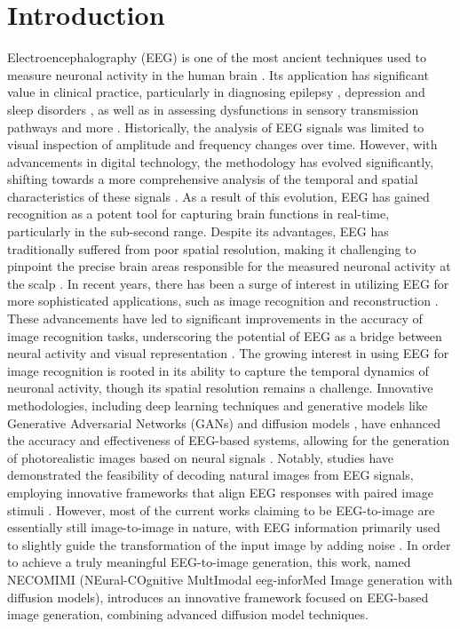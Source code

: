 \documentclass{article}
\begin{document}
\section{Introduction}
Electroencephalography (EEG) is one of the most ancient techniques used to measure neuronal activity in the human brain \cite{mary_1959, millett_2001}. Its application has significant value in clinical practice, particularly in diagnosing epilepsy \cite{reif_strzelczyk_rosenow_2016}, depression \cite{li_chen_cheng_chen_chen_chen_bai_tsai_2023} and sleep disorders \cite{Hussain2022Quantitative}, as well as in assessing dysfunctions in sensory transmission pathways \cite{Thoma2003Lateralization} and more \cite{Perrottelli2021EEG-Based}. Historically, the analysis of EEG signals was limited to visual inspection of amplitude and frequency changes over time. However, with advancements in digital technology, the methodology has evolved significantly, shifting towards a more comprehensive analysis of the temporal and spatial characteristics of these signals \cite{frey_2016}. As a result of this evolution, EEG has gained recognition as a potent tool for capturing brain functions in real-time, particularly in the sub-second range. Despite its advantages, EEG has traditionally suffered from poor spatial resolution, making it challenging to pinpoint the precise brain areas responsible for the measured neuronal activity at the scalp \cite{Li2022Concurrent}. In recent years, there has been a surge of interest in utilizing EEG for more sophisticated applications, such as image recognition and reconstruction \cite{mai_zhang_fang_zhang_2023}. These advancements have led to significant improvements in the accuracy of image recognition tasks, underscoring the potential of EEG as a bridge between neural activity and visual representation \cite{spampinato_2016, brain2img}. The growing interest in using EEG for image recognition is rooted in its ability to capture the temporal dynamics of neuronal activity, though its spatial resolution remains a challenge. Innovative methodologies, including deep learning techniques and generative models like Generative Adversarial Networks (GANs) \cite{goodfellow_2014} and diffusion models \cite{ho_jain_abbeel_2020}, have enhanced the accuracy and effectiveness of EEG-based systems, allowing for the generation of photorealistic images based on neural signals \cite{brain2img, kumar_2017, singh_pandey_miyapuram_raman_2023}. Notably, studies have demonstrated the feasibility of decoding natural images from EEG signals, employing innovative frameworks that align EEG responses with paired image stimuli \cite{bai_wang_cao_ge_yuan_shan_2023}. However, most of the current works claiming to be EEG-to-image are essentially still image-to-image in nature, with EEG information primarily used to slightly guide the transformation of the input image by adding noise \cite{brain2img, palazzo_spampinato_kavasidis_giordano_shah, khare_choubey_amar_udutalapalli_2022, bai_wang_cao_ge_yuan_shan_2023}. In order to achieve a truly meaningful EEG-to-image generation, this work, named NECOMIMI (NEural-COgnitive MultImodal eeg-inforMed Image generation with diffusion models), introduces an innovative framework focused on EEG-based image generation, combining advanced diffusion model techniques.
\end{document}
